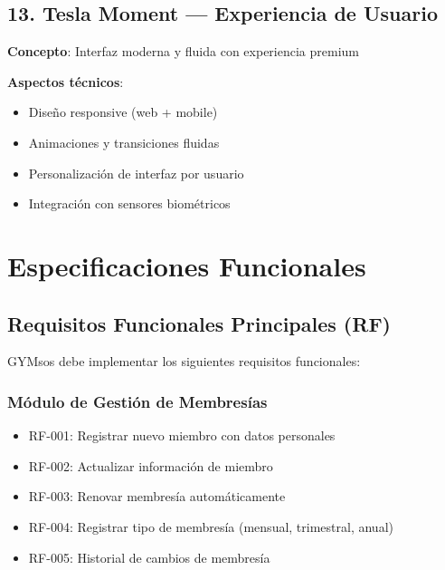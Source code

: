 \documentclass[11pt,a4paper]{article}
\begin{document}
\begin{itemize}
\subsection{13. Tesla Moment — Experiencia de Usuario}

\begin{definicion}
\textbf{Concepto}: Interfaz moderna y fluida con experiencia premium
\end{definicion}

\textbf{Aspectos técnicos}:
\begin{itemize}
    \item Diseño responsive (web + mobile)
    \item Animaciones y transiciones fluidas
    \item Personalización de interfaz por usuario
    \item Integración con sensores biométricos
\end{itemize}

\section{Especificaciones Funcionales}

\subsection{Requisitos Funcionales Principales (RF)}

GYMsos debe implementar los siguientes requisitos funcionales:

\subsubsection{Módulo de Gestión de Membresías}

\begin{itemize}
    \item RF-001: Registrar nuevo miembro con datos personales
    \item RF-002: Actualizar información de miembro
    \item RF-003: Renovar membresía automáticamente
    \item RF-004: Registrar tipo de membresía (mensual, trimestral, anual)
    \item RF-005: Historial de cambios de membresía
\end{itemize}


\end{itemize}
\end{document}
